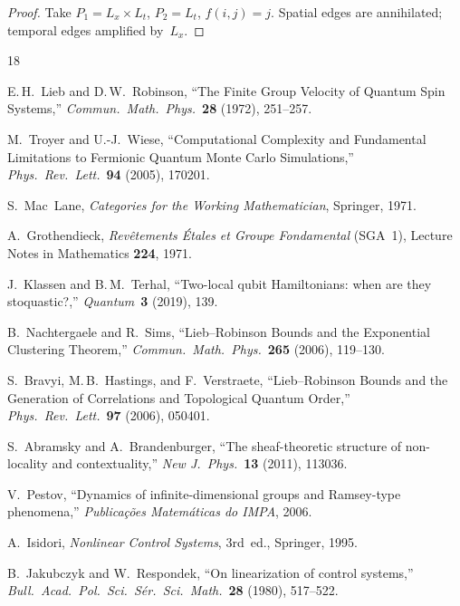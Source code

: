 \documentclass[12pt,a4paper]{amsart}
\theoremstyle{plain}
\theoremstyle{definition}
\theoremstyle{remark}
\begin{document}
\begin{proof}
Take $P_1 = L_x \times L_t$, $P_2 = L_t$, $f(i,j) = j$. Spatial
edges are annihilated; temporal edges amplified by~$L_x$.
\end{proof}



\begin{thebibliography}{18}

E.\,H.~Lieb and D.\,W.~Robinson,
``The Finite Group Velocity of Quantum Spin Systems,''
\emph{Commun.\ Math.\ Phys.}\ \textbf{28} (1972), 251--257.

M.~Troyer and U.-J.~Wiese,
``Computational Complexity and Fundamental Limitations to Fermionic
Quantum Monte Carlo Simulations,''
\emph{Phys.\ Rev.\ Lett.}\ \textbf{94} (2005), 170201.

S.~Mac~Lane,
\emph{Categories for the Working Mathematician}, Springer, 1971.

A.~Grothendieck,
\emph{Rev\^etements \'Etales et Groupe Fondamental} (SGA~1),
Lecture Notes in Mathematics \textbf{224}, 1971.

J.~Klassen and B.\,M.~Terhal,
``Two-local qubit Hamiltonians: when are they stoquastic?,''
\emph{Quantum}\ \textbf{3} (2019), 139.

B.~Nachtergaele and R.~Sims,
``Lieb--Robinson Bounds and the Exponential Clustering Theorem,''
\emph{Commun.\ Math.\ Phys.}\ \textbf{265} (2006), 119--130.

S.~Bravyi, M.\,B.~Hastings, and F.~Verstraete,
``Lieb--Robinson Bounds and the Generation of Correlations and
Topological Quantum Order,''
\emph{Phys.\ Rev.\ Lett.}\ \textbf{97} (2006), 050401.

S.~Abramsky and A.~Brandenburger,
``The sheaf-theoretic structure of non-locality and contextuality,''
\emph{New J.\ Phys.}\ \textbf{13} (2011), 113036.

V.~Pestov,
``Dynamics of infinite-dimensional groups and Ramsey-type phenomena,''
\emph{Publica\c{c}\~oes Matem\'aticas do IMPA}, 2006.

A.~Isidori,
\emph{Nonlinear Control Systems}, 3rd~ed., Springer, 1995.

B.~Jakubczyk and W.~Respondek,
``On linearization of control systems,''
\emph{Bull.\ Acad.\ Pol.\ Sci.\ S\'er.\ Sci.\ Math.}\ \textbf{28}
(1980), 517--522.




\end{thebibliography}
\end{document}
